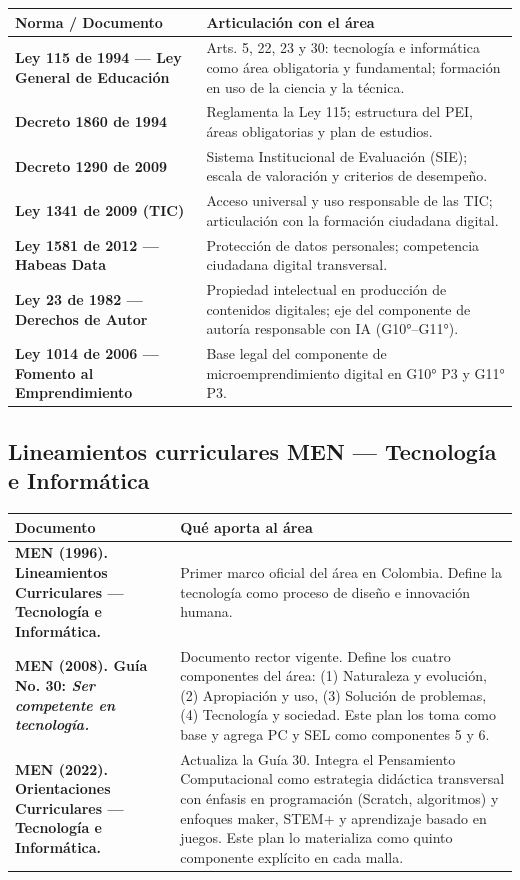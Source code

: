 \documentclass[12pt, a4paper]{article}
\begin{document}
\begin{longtable}{|L{6.5cm}|L{7.5cm}|}
\hline
{}
\color{white}\textbf{Norma / Documento} &
\color{white}\textbf{Articulación con el área} \\
\hline
\endhead
\textbf{Ley 115 de 1994 — Ley General de Educación} &
Arts. 5, 22, 23 y 30: tecnología e informática como área obligatoria
y fundamental; formación en uso de la ciencia y la técnica. \\
\hline
\textbf{Decreto 1860 de 1994} &
Reglamenta la Ley 115; estructura del PEI, áreas obligatorias y plan de estudios. \\
\hline
\textbf{Decreto 1290 de 2009} &
Sistema Institucional de Evaluación (SIE); escala de valoración y criterios
de desempeño. \\
\hline
\textbf{Ley 1341 de 2009 (TIC)} &
Acceso universal y uso responsable de las TIC; articulación con la formación
ciudadana digital. \\
\hline
\textbf{Ley 1581 de 2012 — Habeas Data} &
Protección de datos personales; competencia ciudadana digital transversal. \\
\hline
\textbf{Ley 23 de 1982 — Derechos de Autor} &
Propiedad intelectual en producción de contenidos digitales; eje del
componente de autoría responsable con IA (G10°–G11°). \\
\hline
\textbf{Ley 1014 de 2006 — Fomento al Emprendimiento} &
Base legal del componente de microemprendimiento digital en G10° P3
y G11° P3. \\
\hline
\end{longtable}

\subsection{Lineamientos curriculares MEN — Tecnología e Informática}

\begin{longtable}{|L{6.5cm}|L{7.5cm}|}
\hline
{}
\color{white}\textbf{Documento} &
\color{white}\textbf{Qué aporta al área} \\
\hline
\endhead
\textbf{MEN (1996). Lineamientos Curriculares — Tecnología e Informática.} &
Primer marco oficial del área en Colombia. Define la tecnología
como proceso de diseño e innovación humana. \\
\hline
\textbf{MEN (2008). Guía No. 30: \textit{Ser competente en tecnología.}} &
Documento rector vigente. Define los cuatro componentes del área:
(1) Naturaleza y evolución, (2) Apropiación y uso,
(3) Solución de problemas, (4) Tecnología y sociedad.
Este plan los toma como base y agrega PC y SEL como componentes 5 y 6. \\
\hline
\textbf{MEN (2022). Orientaciones Curriculares — Tecnología e Informática.} &
Actualiza la Guía 30. Integra el Pensamiento Computacional como
estrategia didáctica transversal con énfasis en programación (Scratch,
algoritmos) y enfoques maker, STEM+ y aprendizaje basado en juegos.
Este plan lo materializa como quinto componente explícito en cada malla. \\
\hline
\end{longtable}
\end{document}
